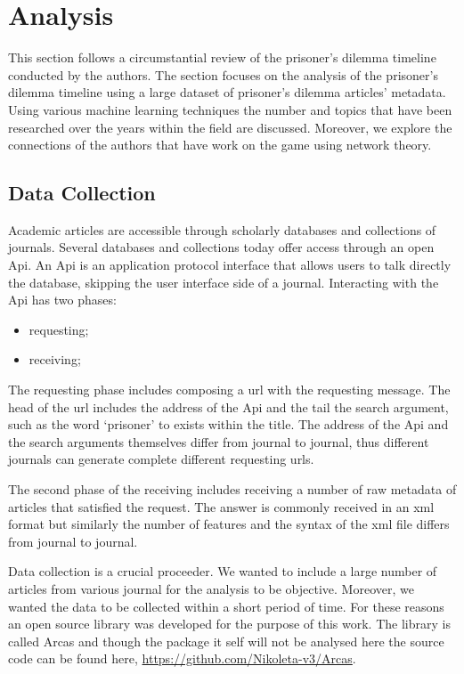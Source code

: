 \documentclass{article}
\begin{document}
\section{Analysis}\label{section:analysis}

This section follows a circumstantial review of the prisoner's dilemma timeline
conducted by the authors. The section focuses on the analysis of the 
prisoner's dilemma timeline using a large dataset of prisoner's dilemma articles'
metadata. Using various machine learning techniques the number and topics that
have been researched over the years within the field are discussed. Moreover, we 
explore the connections of the authors that have work on the game using
network theory.

\subsection{Data Collection}

Academic articles are accessible through scholarly databases and collections of
journals. Several databases and collections today offer access through an open 
Api. An Api is an application protocol interface that allows users to talk
directly the database, skipping the user interface side of a journal.
Interacting with the Api has two phases:

\begin{itemize}
    \item requesting;
    \item receiving;
\end{itemize}

The requesting phase includes composing a url with the requesting message.
The head of the url includes the address of the Api and the tail the search 
argument, such as the word `prisoner' to exists within the title. The address 
of the Api and the search arguments themselves differ from journal to journal, 
thus different journals can generate complete different requesting urls. 

The second phase of the receiving includes receiving a number of raw metadata of
articles that satisfied the request. The answer is commonly received in an xml
format but similarly the number of features and the syntax of the xml file 
differs from journal to journal.

Data collection is a crucial proceeder. We wanted to include a large number of
articles from various journal for the analysis to be objective. Moreover, we 
wanted the data to be collected within a short period of time. For these reasons
an open source library was developed for the purpose of this work. The library
is called Arcas and though the package it self will not be analysed here the 
source code can be found here, \url{https://github.com/Nikoleta-v3/Arcas}. 
\end{document}
